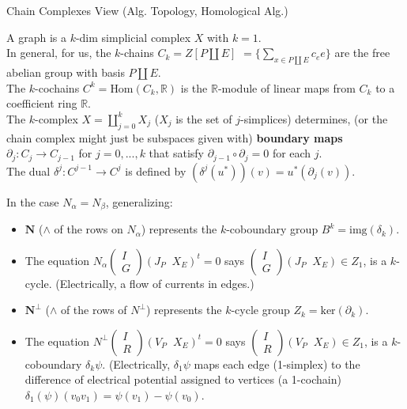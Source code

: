 \documentclass{beamer}
\newcommand{\dunion}{\coprod}
\newcommand{\Reals}{\ensuremath{\mathbb{R}}}
\newcommand{\ext}[1]{\ensuremath{\mathbf{#1}}}
\begin{document}
\newcommand{\COEF}{\Reals}

\begin{frame}{Chain Complexes View (Alg. Topology, Homological Alg.)}

 A graph is a $k$-dim simplicial complex $X$ with $k=1$.\\
  In general, for us,
  the $k$-chains $C_k=Z[P\dunion E]$ $=\{ \sum_{x\in P\dunion E} c_e e\}$ are
  the free abelian group with basis $P\dunion E$.\\
  The $k$-cochains $C^k = \text{Hom}(C_k,\COEF)$ is the $\COEF$-module of linear maps
  from $C_k$ to a coefficient ring $\Reals$.\\
  The $k$-complex $X=\dunion_{j=0}^{k}X_j$ ($X_j$ is the set of $j$-simplices) determines,
  (or the chain complex might just be subspaces given with)
  \textbf{boundary maps} $\partial_j:C_j\rightarrow C_{j-1}$ for $j=0,...,k$ that satisfy
  $\partial_{j-1}\circ\partial_{j}=0$ for each $j$.\\
  The dual $\delta^{j}:C^{j-1}\rightarrow C^{j}$ is defined by
  $(\delta^j(u^*))(v)=u^*(\partial_j(v))$.
\end{frame}
\begin{frame}
  In the case $N_\alpha=N_\beta$, generalizing:

  \begin{itemize}
  \item
    $\ext{N}$ ($\wedge$ of the rows on $N_\alpha$) represents the $k$-coboundary group
    $B^k=\text{img}(\delta_k)$.
  \item
    The equation $N_\alpha\left(\begin{array}{c} I \\ G  \end{array}\right)(J_P\;\;X_E)^t = 0$
    says $\left(\begin{array}{c} I \\ G  \end{array}\right)(J_P\;\;X_E)\in Z_1$, is a $k$-cycle.
     (Electrically, a flow of currents in edges.)
  \item
    $\ext{N}^\perp$ ($\wedge$ of the rows of $N^\perp$) represents the $k$-cycle group
    $Z_k=\text{ker}(\partial_k)$. 
  \item
    The equation $N^\perp\left(\begin{array}{c} I \\ R  \end{array}\right)(V_P\;\;X_E)^t = 0$
    says $\left(\begin{array}{c} I \\ R  \end{array}\right)(V_P\;\;X_E)\in Z_1$, is a $k$-coboundary
    $\delta_k \psi$.
    (Electrically, $\delta_1 \psi$ maps each edge (1-simplex) to the difference of electrical
    potential assigned to vertices (a 1-cochain) $\delta_1(\psi)(v_0v_1) = \psi(v_1)-\psi(v_0)$.
  \end{itemize}
  
\end{frame}
\end{document}
